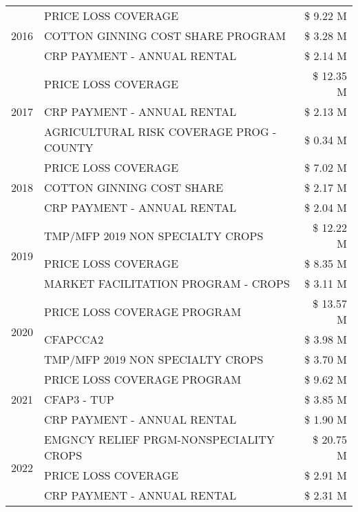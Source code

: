 \begin{tabular}{llr}
\cline{1-3}
\multirow[t]{3}{*}{2016} & PRICE LOSS COVERAGE & \$ 9.22 M \\
 & COTTON GINNING COST SHARE PROGRAM & \$ 3.28 M \\
 & CRP PAYMENT - ANNUAL RENTAL & \$ 2.14 M \\
\cline{1-3}
\multirow[t]{3}{*}{2017} & PRICE LOSS COVERAGE & \$ 12.35 M \\
 & CRP PAYMENT - ANNUAL RENTAL & \$ 2.13 M \\
 & AGRICULTURAL RISK COVERAGE PROG - COUNTY & \$ 0.34 M \\
\cline{1-3}
\multirow[t]{3}{*}{2018} & PRICE LOSS COVERAGE & \$ 7.02 M \\
 & COTTON GINNING COST SHARE & \$ 2.17 M \\
 & CRP PAYMENT - ANNUAL RENTAL & \$ 2.04 M \\
\cline{1-3}
\multirow[t]{3}{*}{2019} & TMP/MFP 2019 NON SPECIALTY CROPS & \$ 12.22 M \\
 & PRICE LOSS COVERAGE & \$ 8.35 M \\
 & MARKET FACILITATION PROGRAM - CROPS & \$ 3.11 M \\
\cline{1-3}
\multirow[t]{3}{*}{2020} & PRICE LOSS COVERAGE PROGRAM & \$ 13.57 M \\
 & CFAPCCA2 & \$ 3.98 M \\
 & TMP/MFP 2019 NON SPECIALTY CROPS & \$ 3.70 M \\
\cline{1-3}
\multirow[t]{3}{*}{2021} & PRICE LOSS COVERAGE PROGRAM & \$ 9.62 M \\
 & CFAP3 - TUP & \$ 3.85 M \\
 & CRP PAYMENT - ANNUAL RENTAL & \$ 1.90 M \\
\cline{1-3}
\multirow[t]{3}{*}{2022} & EMGNCY RELIEF PRGM-NONSPECIALITY CROPS & \$ 20.75 M \\
 & PRICE LOSS COVERAGE & \$ 2.91 M \\
 & CRP PAYMENT - ANNUAL RENTAL & \$ 2.31 M \\
\cline{1-3}
\bottomrule
\end{tabular}
